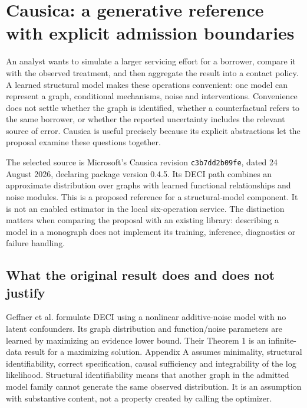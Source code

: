 \section{Causica: a generative reference with explicit admission boundaries}
\label{exec14:causica-contract}

An analyst wants to simulate a larger servicing effort for a borrower, compare
it with the observed treatment, and then aggregate the result into a contact
policy. A learned structural model makes these operations convenient: one
model can represent a graph, conditional mechanisms, noise and interventions.
Convenience does not settle whether the graph is identified, whether a
counterfactual refers to the same borrower, or whether the reported uncertainty
includes the relevant source of error. Causica is useful precisely because
its explicit abstractions let the proposal examine these questions together.

The selected source is Microsoft's Causica revision \texttt{c3b7dd2b09fe},
dated 24 August 2026, declaring package version 0.4.5. Its DECI path combines
an approximate distribution over graphs with learned functional relationships
and noise modules. This is a proposed reference for a structural-model
component. It is not an enabled estimator in the local six-operation service.
The distinction matters when comparing the proposal with an existing library:
describing a model in a monograph does not implement its training, inference,
diagnostics or failure handling. \citep{exec14_causica_primary,exec14_causica_decision}

\subsection{What the original result does and does not justify}

Geffner et al. formulate DECI using a nonlinear additive-noise model with no
latent confounders. Its graph distribution and function/noise parameters are
learned by maximizing an evidence lower bound. Their Theorem 1 is an
infinite-data result for a maximizing solution. Appendix A assumes minimality,
structural identifiability, correct specification, causal sufficiency and
integrability of the log likelihood. Structural identifiability means that
another graph in the admitted model family cannot generate the same observed
distribution. It is an assumption with substantive content, not a property
created by calling the optimizer. \citep{exec14_causica_geffner}

